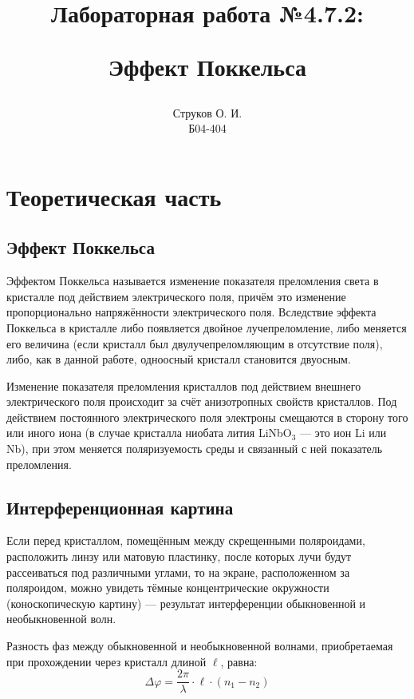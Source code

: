 \documentclass[12pt, a4paper]{article}
\begin{document}
\title{\begin{center}Лабораторная работа №4.7.2:\end{center}
Эффект Поккельса}
\author{Струков О. И. \\ Б04-404}
\date{}

\thispagestyle{empty}
\maketitle
\newpage
{}

\section*{Теоретическая часть}

\subsection*{Эффект Поккельса}

Эффектом Поккельса называется изменение показателя преломления света в кристалле под действием электрического поля, причём это изменение пропорционально напряжённости электрического поля. Вследствие эффекта Поккельса в кристалле либо появляется двойное лучепреломление, либо меняется его величина (если кристалл был двулучепреломляющим в отсутствие поля), либо, как в данной работе, одноосный кристалл становится двуосным.

Изменение показателя преломления кристаллов под действием внешнего электрического поля происходит за счёт анизотропных свойств кристаллов. Под действием постоянного электрического поля электроны смещаются в сторону того или иного иона (в случае кристалла ниобата лития LiNbO$_3$ --- это ион Li или Nb), при этом меняется поляризуемость среды и связанный с ней показатель преломления.

\subsection*{Интерференционная картина}

Если перед кристаллом, помещённым между скрещенными поляроидами, расположить линзу или матовую пластинку, после которых лучи будут рассеиваться под различными углами, то на экране, расположенном за поляроидом, можно увидеть тёмные концентрические окружности (коноскопическую картину) --- результат интерференции обыкновенной и необыкновенной волн.

Разность фаз между обыкновенной и необыкновенной волнами, приобретаемая при прохождении через кристалл длиной $\ell$, равна:
\begin{equation}
\Delta\varphi = \frac{2\pi}{\lambda} \cdot \ell \cdot (n_1 - n_2)
\end{equation}
\end{document}
